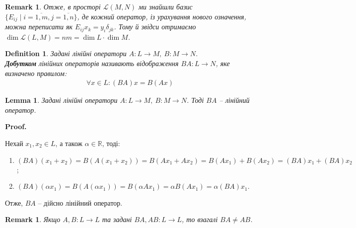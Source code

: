 \documentclass[a4paper, 10pt]{article}
\makeatletter
\theoremstyle{theoremdd}
\newtheorem{definition}[theorem]{Definition}
\newtheorem{remark}[theorem]{Remark}
\newtheorem{lemma}[theorem]{Lemma}
\renewenvironment{proof}[1][Proof.\\]{\par
\pushQED{\hfill \qed}%
\normalfont \topsep6\p@\@plus6\p@\relax
\trivlist
\item\relax
{\bfseries
#1\@addpunct{.}}\hspace\labelsep\ignorespaces
}{%
\popQED\endtrivlist\@endpefalse
}
\makeatother
\begin{document}
	\begin{remark}
	Отже, в просторі $\mathcal{L}(M,N)$ ми знайшли базис $\{E_{ij} \mid i = \overline{1,m}, j = \overline{1,n}\}$, де кожний оператор, із урахування нового означення, можна переписати як $E_{ij}x_k = y_i \delta_{jk}$. Тому й звідси отримаємо $\dim \mathcal{L}(L,M) = nm = \dim L \cdot \dim M$.
	\end{remark}
	
	\begin{definition}
	Задані лінійні оператори $A \colon L \to M,\ B \colon M \to N$.\\
	\textbf{Добутком} лінійних операторів називають відображення $BA \colon L \to N$, яке визначено правилом:
	\begin{align*}
	\forall x \in L: (BA)x = B(Ax)
	\end{align*}
	\end{definition}
	
	\begin{lemma}
	Задані лінійні оператори $A \colon L \to M,\ B \colon M \to N$. Тоді $BA$ -- лінійний оператор.
	\end{lemma}
	
	\begin{proof}
	Нехай $x_1,x_2 \in L$, а також $\alpha \in \mathbb{R}$, тоді:
	\begin{enumerate}[nosep, wide=0pt, label={\arabic*)}]
	\item $(BA)(x_1+x_2) = B(A(x_1+x_2)) = B(Ax_1+Ax_2)=B(Ax_1) + B(Ax_2)=(BA)x_1+(BA)x_2$;
	\item $(BA)(\alpha x_1) = B(A(\alpha x_1)) = B(\alpha Ax_1) = \alpha B(Ax_1) = \alpha (BA)x_1$.
	\end{enumerate}
	\noindent
	Отже, $BA$ -- дійсно лінійний оператор.
	\end{proof}
	
	\begin{remark}
	Якщо $A,B \colon L \to L$ та задані $BA, AB \colon L \to L$, то взагалі $BA \neq AB$.
	\end{remark}
	
\end{document}
